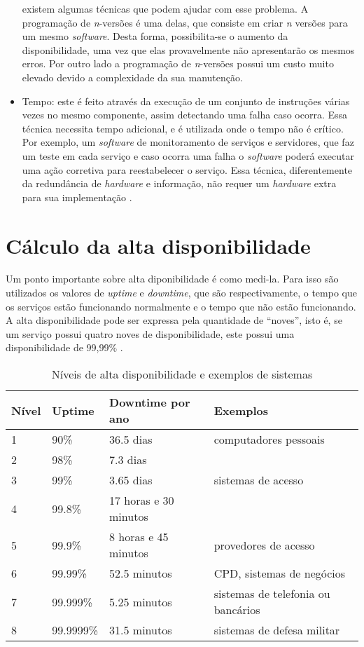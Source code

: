 \begin{itemize}
 existem algumas técnicas que podem ajudar com esse problema. A programação de \textit{n}-versões é uma delas, que consiste em criar 
 \textit{n} versões para um mesmo \textit{software}. Desta forma, possibilita-se o aumento da disponibilidade, uma vez que elas provavelmente 
 não apresentarão os mesmos erros. Por outro lado a programação de \textit{n}-versões possui um custo muito elevado devido a complexidade 
 da sua manutenção.
 \item Tempo: este é feito através da execução de um conjunto de instruções várias vezes no mesmo componente, assim detectando uma falha caso 
 ocorra. Essa técnica necessita tempo adicional, e é utilizada onde o tempo não é crítico. Por exemplo, um \textit{software} de monitoramento 
 de serviços e servidores, que faz um teste em cada serviço e caso ocorra uma falha o \textit{software} poderá executar uma ação corretiva para 
 reestabelecer o serviço. Essa técnica, diferentemente da redundância de \textit{hardware} e informação, não requer um \textit{hardware} 
 extra para sua implementação \cite{costa2009}.
\end{itemize}

\section{Cálculo da alta disponibilidade}

Um ponto importante sobre alta diponibilidade é como medi-la. Para isso são utilizados os valores de \textit{uptime} e \textit{downtime}, 
que são respectivamente, o tempo que os serviços estão funcionando normalmente e o tempo que não estão funcionando. A alta disponibilidade 
pode ser expressa pela quantidade de ``noves'', isto é, se um serviço possui quatro noves de disponibilidade, este possui uma 
disponibilidade de 99,99\% \cite{pereirafilho2004}.

\begin{table}
\caption {Níveis de alta disponibilidade e exemplos de sistemas}
\label{tab:dispniveis}
\begin{center}
\begin{tabular}{|l|l|l|l|}\hline
Nível & Uptime & Downtime por ano & Exemplos\\\hline
1 & 90\% & 36.5 dias & computadores pessoais\\\hline
2 & 98\% & 7.3 dias & \\\hline
3 & 99\% & 3.65 dias & sistemas de acesso\\\hline
4 & 99.8\% & 17 horas e 30 minutos & \\\hline
5 & 99.9\% & 8 horas e 45 minutos & provedores de acesso\\\hline
6 & 99.99\% & 52.5 minutos & CPD, sistemas de negócios\\\hline
7 & 99.999\% & 5.25 minutos & sistemas de telefonia ou bancários\\\hline
8 & 99.9999\% & 31.5 minutos & sistemas de defesa militar\\\hline
\end{tabular}
\end{center}
\end{table}

